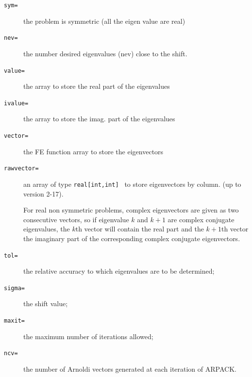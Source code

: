 \documentclass[a4paper,twoside,12pt]{book}
\begin{document}
\begin{description}
          \item[\texttt{sym=}] 
          the problem is symmetric (all the eigen value are real)
          \item[\texttt{nev=}] 
          the number desired eigenvalues (nev)  close to the shift.
        \item[\texttt{value=}]  
        the array to store the real part of the eigenvalues
         \item[\texttt{ivalue=}]   
         the array to store the imag. part of the eigenvalues
         \item[\texttt{vector=}]   
         the  FE function array to store the eigenvectors
         \item[\texttt{rawvector=}]  
          an array of type \texttt{real[int,int] } to store eigenvectors by column. (up to version 2-17).

 For real non symmetric problems, complex eigenvectors are given as two consecutive vectors, so if eigenvalue $k$ and $k+1$ are complex conjugate eigenvalues, the $k$th vector will contain the real part and the $k+1$th vector the imaginary part of the corresponding complex conjugate eigenvectors.

         \item[\texttt{tol=}]  
         the relative accuracy to which eigenvalues are to be determined;
         \item[\texttt{sigma=}]    the shift value;
         \item[\texttt{maxit=}]    the maximum number of iterations allowed;
          \item[\texttt{ncv=}]     the number of Arnoldi vectors generated at each iteration of ARPACK.
 \end{description}
\end{document}
